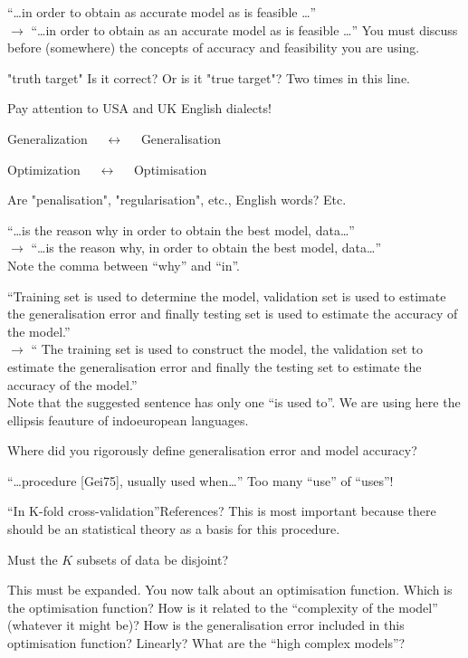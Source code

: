 \documentclass[12pt,reqno]{amsart}
\def\blue#1{{\color{blue} #1}}
\def\red#1{{\color{red} #1}}
\begin{document}
\begin{description}[style=unboxed,leftmargin=0cm,itemsep=3ex]
``\dots in order to obtain as accurate model as is feasible \dots''\\
$\rightarrow$
``\dots in order to obtain as \red{an} accurate model as is feasible \dots''
You must discuss before (somewhere) the concepts of \red{accuracy} and
\red{feasibility} you are using.

"truth target" Is it correct? Or is it "true target"?
Two times in this line.

Pay attention to USA and UK English dialects!

Generalization $\quad\longleftrightarrow\quad$ Generalisation

Optimization  $\quad\longleftrightarrow\quad$ Optimisation

Are "penalisation", "regularisation", etc., English words? Etc.

``\dots is the reason why in order to obtain the best model, data\dots'' \\
$\rightarrow$
``\dots is the reason why, in order to obtain the best model, data\dots'' \\
Note the comma between ``why'' and ``in''.

``Training set is used to determine the model, validation set is used 
to estimate the generalisation error and finally testing set is used
to estimate the accuracy of the model.'' \\
$\rightarrow$
``\red{The} training set is used to \red{construct} the model, 
\red{the} validation set to estimate the generalisation error and finally
\red{the} testing set to estimate the accuracy of the model.'' \\
\red{Note that the suggested sentence has only one ``is used to''.
We are using here the \blue{ellipsis} feauture of indoeuropean languages.}

Where did you rigorously define \red{generalisation error} and
\red{model accuracy}?

``\dots procedure [Gei75], \red{usually used} when\dots''
Too many \red{``use''} of \red{``uses''}!

``In K-fold cross-validation''\quad References? This is most important
because there should be an statistical theory as a basis for this
procedure.

Must the $K$ subsets of data be disjoint?

This must be expanded.
You now talk about an optimisation function.
Which is the optimisation function?
How is it related to the ``complexity of the model'' (whatever it might be)?
How is the generalisation error included in this optimisation function?
Linearly?
What are the ``high complex models''?


\end{description}
\end{document}
